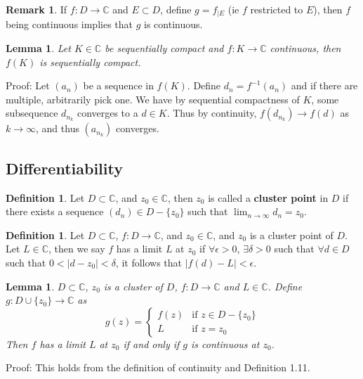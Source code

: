 \documentclass[11pt]{article}
\theoremstyle{plain}
\newtheorem{lemma}[theorem]{Lemma}
\theoremstyle{definition}
\newtheorem{definition}[theorem]{Definition}
\newtheorem{remark}{Remark}
\begin{document}
\begin{remark}
If $f: D \to \mathbb{C}$ and $E \subset D$, define $g = f_{|E}$ (ie $f$ restricted to $E$), then $f$ being continuous implies that $g$ is continuous. 
\end{remark}

\begin{lemma}
Let $K \in \mathbb{C}$ be sequentially compact and $f: K \to \mathbb{C}$ continuous, then $f(K)$ is sequentially compact.
\end{lemma}

Proof: Let $(a_n)$ be a sequence in $f(K)$. Define $d_n = f^{-1}(a_n)$ and if there are multiple, arbitrarily pick one. We have by sequential compactness of $K$, some subsequence $d_{n_{k}}$ converges to a $d \in K$. Thus by continuity, $f(d_{n_k}) \to f(d)$ as $k \to \infty$, and thus $(a_{n_k})$ converges.

\subsection{Differentiability}

\begin{definition}
Let $D \subset \mathbb{C}$, and $z_0 \in \mathbb{C}$, then $z_0$ is called a \textbf{cluster point} in $D$ if there exists a sequence $(d_n) \in D - \{z_0\}$ such that $\lim_{n\to\infty} d_n = z_0$.
\end{definition}

\begin{definition}
Let $D \subset \mathbb{C}$, $f: D \to \mathbb{C}$, and $z_0 \in \mathbb{C}$, and $z_0$ is a cluster point of $D$. Let $L \in \mathbb{C}$, then we say $f$ has a limit $L$ at $z_0$ if $\forall \epsilon > 0$, $\exists \delta > 0$ such that $\forall d \in D$ such that $0 < |d - z_0| < \delta$, it follows that $|f(d) - L| < \epsilon$.
\end{definition}

\begin{lemma}
$D \subset \mathbb{C}$, $z_0$ is a cluster of $D$, $f: D \to \mathbb{C}$ and $L \in \mathbb{C}$. Define $g: D \cup \{z_0\} \to \mathbb{C}$ as 
$$ g(z) = \begin{cases}
f(z) & \text{if }z \in D - \{z_0\} \\
L & \text{if } z = z_0
\end{cases} $$
Then $f$ has a limit $L$ at $z_0$ if and only if $g$ is continuous at $z_0$.
\end{lemma}

Proof: This holds from the definition of continuity and Definition 1.11.
\end{document}
